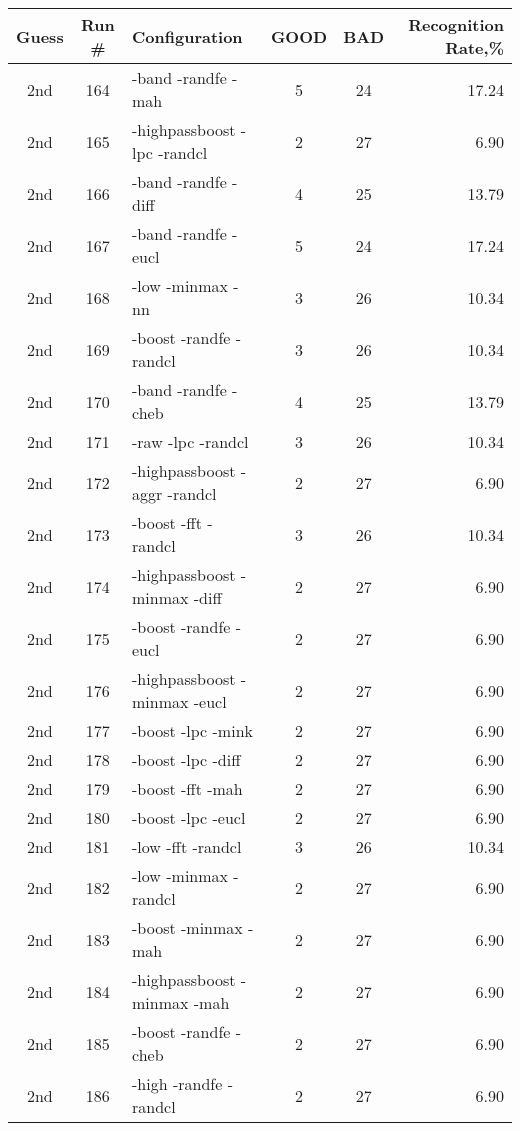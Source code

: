 \begin{table}
\begin{minipage}[b]{\textwidth}
\centering
\begin{tabular}{|c|c|l|c|c|r|} \hline
Guess & Run \# & Configuration & GOOD & BAD & Recognition Rate,\%\\ \hline\hline
2nd & 164 & -band -randfe -mah  & 5 & 24 & 17.24\\ \hline
2nd & 165 & -highpassboost -lpc -randcl  & 2 & 27 & 6.90\\ \hline
2nd & 166 & -band -randfe -diff  & 4 & 25 & 13.79\\ \hline
2nd & 167 & -band -randfe -eucl  & 5 & 24 & 17.24\\ \hline
2nd & 168 & -low -minmax -nn  & 3 & 26 & 10.34\\ \hline
2nd & 169 & -boost -randfe -randcl  & 3 & 26 & 10.34\\ \hline
2nd & 170 & -band -randfe -cheb  & 4 & 25 & 13.79\\ \hline
2nd & 171 & -raw -lpc -randcl  & 3 & 26 & 10.34\\ \hline
2nd & 172 & -highpassboost -aggr -randcl  & 2 & 27 & 6.90\\ \hline
2nd & 173 & -boost -fft -randcl  & 3 & 26 & 10.34\\ \hline
2nd & 174 & -highpassboost -minmax -diff  & 2 & 27 & 6.90\\ \hline
2nd & 175 & -boost -randfe -eucl  & 2 & 27 & 6.90\\ \hline
2nd & 176 & -highpassboost -minmax -eucl  & 2 & 27 & 6.90\\ \hline
2nd & 177 & -boost -lpc -mink  & 2 & 27 & 6.90\\ \hline
2nd & 178 & -boost -lpc -diff  & 2 & 27 & 6.90\\ \hline
2nd & 179 & -boost -fft -mah  & 2 & 27 & 6.90\\ \hline
2nd & 180 & -boost -lpc -eucl  & 2 & 27 & 6.90\\ \hline
2nd & 181 & -low -fft -randcl  & 3 & 26 & 10.34\\ \hline
2nd & 182 & -low -minmax -randcl  & 2 & 27 & 6.90\\ \hline
2nd & 183 & -boost -minmax -mah  & 2 & 27 & 6.90\\ \hline
2nd & 184 & -highpassboost -minmax -mah  & 2 & 27 & 6.90\\ \hline
2nd & 185 & -boost -randfe -cheb  & 2 & 27 & 6.90\\ \hline
2nd & 186 & -high -randfe -randcl  & 2 & 27 & 6.90\\ \hline

\end{tabular}
\end{minipage}
\end{table}
